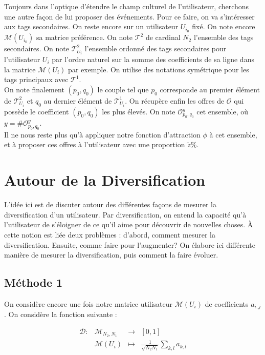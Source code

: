 \documentclass[11pt, oneside]{article}
\begin{document}
Toujours dans l'optique d'étendre le champ culturel de l'utilisateur, cherchons une autre façon de lui proposer des événements. Pour ce faire, on va s'intéresser aux tags secondaires. On reste encore sur un utilisateur $U_{i_0}$ fixé. On note encore $\mathcal{M} (U_{i_0})$ sa matrice préférence. On note $\mathcal{T}^2$ de cardinal $N_2$ l'ensemble des tags secondaires. On note $\mathcal{T}^2_{U_i}$ l'ensemble ordonné des tags secondaires pour l'utilisateur $U_i$ par l'ordre naturel sur la somme des coefficients de sa ligne dans la matrice $\mathcal{M} (U_{i})$ par exemple. On utilise des notations symétrique pour les tags principaux avec $\mathcal{T}^1$. \\
On note finalement $(p_0,q_0)$ le couple tel que $p_0$ corresponde au premier élément de $\mathcal{T}^2_{U_i}$ et $q_0$ au dernier élément de $\mathcal{T}^1_{U_i}$. On récupère enfin les offres de $\mathcal{O}$ qui possède le coefficient $(p_0,q_0)$ les plus élevés. On note $\mathcal{O}_{p_0,q_0}^y$ cet ensemble, où $y = \# \mathcal{O}_{p_0,q_0}^y$. \\

Il ne nous reste plus qu'à appliquer notre fonction d'attraction $\phi$ à cet ensemble, et à proposer ces offres à l'utilisateur avec une proportion $\tilde{z} \%$.

\section{Autour de la Diversification}

L'idée ici est de discuter autour des différentes façons de mesurer la diversification d'un utilisateur. Par diversification, on entend la capacité qu'à l'utilisateur de s'éloigner de ce qu'il aime pour découvrir de nouvelles choses. À cette notion est liée deux problèmes : d'abord, comment mesurer la diversification. Ensuite, comme faire pour l'augmenter? On élabore ici différente manière de mesurer la diversification, puis comment la faire évoluer. 

\subsection{Méthode 1} 

On considère encore une fois notre matrice utilisateur $\mathcal{M} (U_i)$ de coefficients $a_{i,j}$. On considère la fonction suivante : 

\begin{center}
\[
\begin{array}{l|rcl}
\mathcal{D} : &  \mathcal{M}_{N_2,N_1} & \longrightarrow & [0,1] \\
    & \mathcal{M} (U_i) & \longmapsto & \frac{1}{\sqrt{N_2 N_1}} \displaystyle \sum _{k,l} a_{k,l}
    \end{array}
\]

\end{center}
\end{document}
